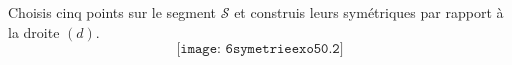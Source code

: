 Choisis cinq points sur le segment $\mathscr S$ et construis leurs
  symétriques par rapport à la droite $(d)$.
  \[\texttt{[image: 6symetrieexo50.2]}\]